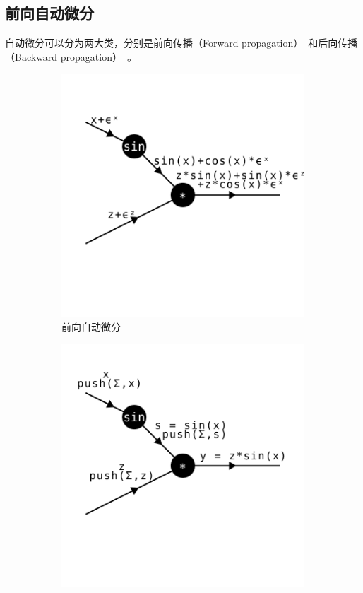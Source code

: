 \documentclass[A4,twoside,fontset=ubuntu,UTF8]{ctexart}
\begin{document}
\subsection{前向自动微分}
    自动微分可以分为两大类，分别是前向传播（Forward propagation）~\cite{Wengert1964}和后向传播（Backward propagation）~\cite{Boltyanski1960}。
    \begin{figure}[t]
\centering
\begin{subfigure}[b]{0.32\textwidth}
    \centering
    \includegraphics[width=\textwidth, trim={1cm 3cm 0cm 1cm}, clip]{./forwarddiff.pdf}
    \caption{\small 前向自动微分}
\end{subfigure}
\begin{subfigure}[b]{0.32\textwidth}
    \centering
    \includegraphics[width=\textwidth, trim={0 3cm 1cm 1cm}, clip]{./backward-forward.pdf}

\end{subfigure}
\end{figure}
\end{document}
